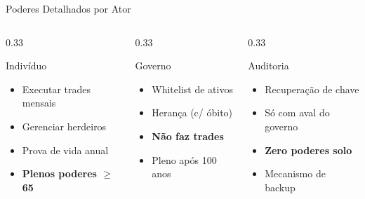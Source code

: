 \documentclass{libs/ufc_format}
\begin{document}
\begin{frame}{Poderes Detalhados por Ator}
    \begin{columns}
        \begin{column}{0.33\textwidth}
            \begin{block}{\small Indivíduo}
                \begin{itemize}
                    \item[\tiny$\bullet$] Executar trades mensais
                    \item[\tiny$\bullet$] Gerenciar herdeiros
                    \item[\tiny$\bullet$] Prova de vida anual
                    \item[\tiny$\bullet$] \textbf{Plenos poderes $\geq$65}
                \end{itemize}
            \end{block}
        \end{column}
        \begin{column}{0.33\textwidth}
            \begin{block}{\small Governo}
                \begin{itemize}
                    \item[\tiny$\bullet$] Whitelist de ativos
                    \item[\tiny$\bullet$] Herança (c/ óbito)
                    \item[\tiny$\bullet$] \textbf{Não faz trades}
                    \item[\tiny$\bullet$] Pleno após 100 anos
                \end{itemize}
            \end{block}
        \end{column}
        \begin{column}{0.33\textwidth}
            \begin{block}{\small Auditoria}
                \begin{itemize}
                    \item[\tiny$\bullet$] Recuperação de chave
                    \item[\tiny$\bullet$] Só com aval do governo
                    \item[\tiny$\bullet$] \textbf{Zero poderes solo}
                    \item[\tiny$\bullet$] Mecanismo de backup
                \end{itemize}
            \end{block}
        \end{column}
    \end{columns}

    \vspace{0.3cm}

\end{frame}
\end{document}
